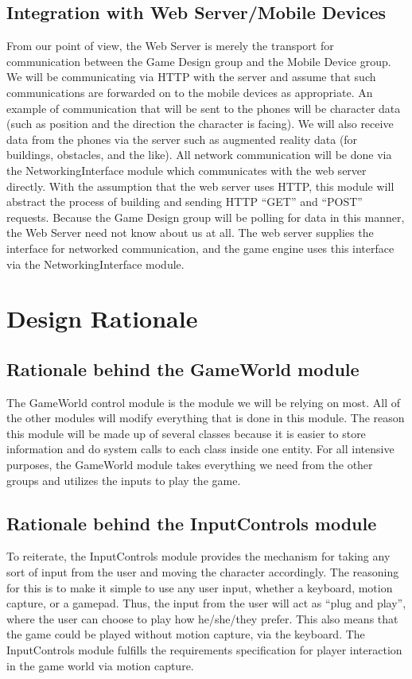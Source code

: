 \documentclass[10pt,letterpaper,oneside,english]{article}
\begin{document}
\subsection{Integration with Web Server/Mobile Devices}

From our point of view, the Web Server is merely the transport for communication between the Game Design group and the Mobile Device group. We will be communicating via HTTP with the server and assume that such communications are forwarded on to the mobile devices as appropriate. An example of communication that will be sent to the phones will be character data (such as position and the direction the character is facing). We will also receive data from the phones via the server such as augmented reality data (for buildings, obstacles, and the like). All network communication will be done via the NetworkingInterface module which communicates with the web server directly. With the assumption that the web server uses HTTP, this module will abstract the process of building and sending HTTP “GET” and “POST” requests. Because the Game Design group will be polling for data in this manner, the Web Server need not know about us at all. The web server supplies the interface for networked communication, and the game engine uses this interface via the NetworkingInterface module.

\section{Design Rationale}

\subsection{Rationale behind the GameWorld module}

The GameWorld control module is the module we will be relying on most. All of the other modules will modify everything that is done in this module. The reason this module will be made up of several classes because it is easier to store information and do system calls to each class inside one entity. For all intensive purposes, the GameWorld module takes everything we need from the other groups and utilizes the inputs to play the game. 

\subsection{Rationale behind the InputControls module}

To reiterate, the InputControls module provides the mechanism for taking any sort of input from the user and moving the character accordingly. The reasoning for this is to make it simple to use any user input, whether a keyboard, motion capture, or a gamepad. Thus, the input from the user will act as ``plug and play'', where the user can choose to play how he/she/they prefer. This also means that the game could be played without motion capture, via the keyboard. The InputControls module fulfills the requirements specification for player interaction in the game world via motion capture.
\end{document}

